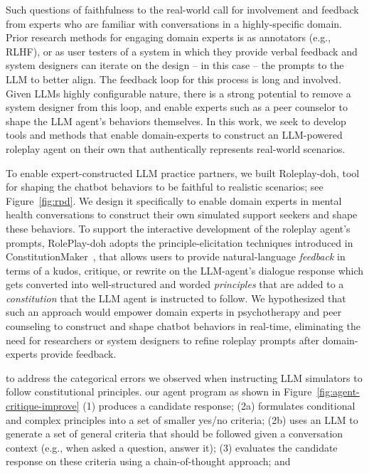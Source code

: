 Such questions of faithfulness to the real-world call for involvement and feedback from experts who are familiar with conversations in a highly-specific domain. Prior research methods for engaging domain experts is as annotators (e.g., RLHF), or as user testers of a system in which they provide verbal feedback and system designers can iterate on the design -- in this case -- the prompts to the LLM to better align.  The feedback loop for this process is long and involved. Given LLMs highly configurable nature, there is a strong potential to remove a system designer from this loop, and enable experts such as a peer counselor to shape the LLM agent's behaviors themselves. In this work, we seek to develop tools and methods that enable domain-experts to construct an LLM-powered roleplay agent on their own that authentically represents real-world scenarios. 


To enable expert-constructed LLM practice partners, we built Roleplay-doh, tool for shaping the chatbot behaviors to be faithful to realistic scenarios; see Figure~\ref{fig:rpd}. We design it specifically to enable domain experts in mental health conversations to construct their own simulated support seekers and shape these behaviors. To support the interactive development of the roleplay agent's prompts, RolePlay-doh adopts the principle-elicitation techniques introduced in ConstitutionMaker~\cite{petridis2023constitutionmaker}, that allows users to provide natural-language {\em feedback} in terms of a kudos, critique, or rewrite on the LLM-agent's dialogue response which gets converted into well-structured and worded {\em principles} that are added to a {\em constitution} that the LLM agent is instructed to follow. We hypothesized that such an approach would empower domain experts in psychotherapy and peer counseling to construct and shape chatbot behaviors in real-time, eliminating the need for researchers or system designers to refine roleplay prompts after domain-experts provide feedback.


to address the categorical errors we observed when instructing LLM simulators to follow constitutional principles.   our agent program as shown in Figure~\ref{fig:agent-critique-improve} (1) produces a candidate response; (2a) formulates conditional and complex principles into a set of smaller yes/no criteria; (2b) uses an LLM to generate a set of general criteria that should be followed given a conversation context (e.g., when asked a question, answer it); (3) evaluates the candidate response on these criteria using a chain-of-thought approach; and  


